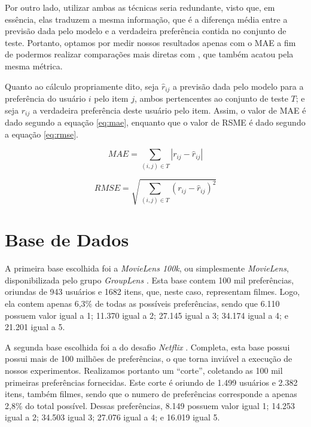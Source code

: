 Por outro lado, utilizar ambas as técnicas seria redundante, visto que, em essência, elas traduzem a mesma informação, que é a diferença média entre a previsão dada pelo modelo e a verdadeira preferência contida no conjunto de teste. Portanto, optamos por medir nossos resultados apenas com o MAE a fim de podermos realizar comparações mais diretas com \citep{Elahi:2014:ALS:2542182.2542195}, que também acatou pela mesma métrica.

Quanto ao cálculo propriamente dito, seja $\hat{r}_{ij}$ a previsão dada pelo modelo para a preferência do usuário $i$ pelo item $j$, ambos pertencentes ao conjunto de teste $T$; e seja $r_{ij}$ a verdadeira preferência deste usuário pelo item. Assim, o valor de MAE é dado segundo a equação \ref{eq:mae}, enquanto que o valor de RSME é dado segundo a equação \ref{eq:rmse}. 

\begin{equation}
MAE = \sum_{(i,j) \in T} |r_{ij} - \hat{r}_{ij}|
\label{eq:mae}
\end{equation}

\begin{equation}
RMSE = \sqrt{\sum_{(i,j) \in T} (r_{ij} - \hat{r}_{ij})^2}
\label{eq:rmse}
\end{equation}

\section{Base de Dados}

A primeira base escolhida foi a \textit{MovieLens 100k}, ou simplesmente \textit{MovieLens}, disponibilizada pelo grupo \textit{GroupLens} \citep{Herlocker:1999:AFP:312624.312682}. Esta base contem 100 mil preferências, oriundas de 943 usuários e 1682 itens, que, neste caso, representam filmes. Logo, ela contem apenas 6,3\% de todas as possíveis preferências, sendo que 6.110 possuem valor igual a 1; 11.370 igual a 2; 27.145 igual a 3; 34.174 igual a 4; e 21.201 igual a 5.

A segunda base escolhida foi a do desafio \textit{Netflix} \citep{Bennett07thenetflix}. Completa, esta base possui possui mais de 100 milhões de preferências, o que torna inviável a execução de nossos experimentos. Realizamos portanto um ``corte'', coletando as 100 mil primeiras preferências fornecidas. Este corte é oriundo de 1.499 usuários e 2.382 itens, também filmes, sendo que o numero de preferências corresponde a apenas 2,8\% do total possível. Dessas preferências, 8.149 possuem valor igual 1; 14.253 igual a 2; 34.503 igual 3; 27.076 igual a 4; e 16.019 igual 5.

